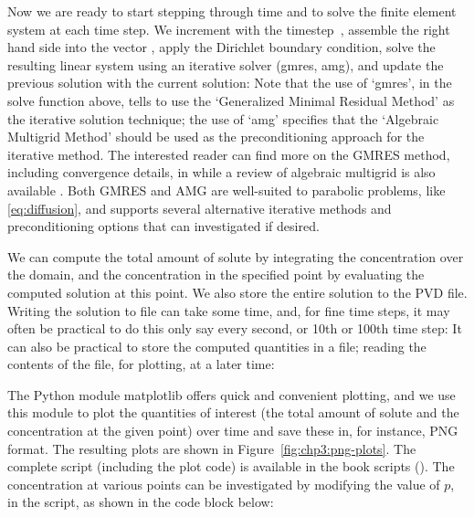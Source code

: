 Now we are ready to start stepping through time and to solve the finite
element system at each time step. We increment
 with the timestep~, assemble
the right hand side into the vector , apply the
Dirichlet boundary condition, solve the resulting linear system using
an iterative solver (gmres, amg), and update the previous solution
with the current solution:
Note that the use of `gmres', in the solve function above, tells {\fenics} to 
use the `Generalized Minimal Residual Method' as the iterative solution 
technique; the use of `amg' specifies that the `Algebraic Multigrid Method' 
should be used as the preconditioning approach for the iterative method.  The 
interested reader can find more on the GMRES method, including convergence 
details, in \cite{greenbaum1997} while a review of algebraic multigrid 
is also available \cite{stuben2001}.  Both GMRES and AMG are well-suited to 
parabolic problems, like \eqref{eq:diffusion}, and {\fenics} supports several 
alternative iterative methods and preconditioning options 
\cite{langtangen2016solving} that can investigated if desired.  %


We can compute the total amount of solute by integrating the concentration
over the domain, and the concentration in the specified point by
evaluating the computed solution at this point. We also store the
entire solution to the PVD file. Writing the solution to file can take
some time, and, for fine time steps, it may often be practical to 
do this only say every second, or 10th or 100th time step:
It can also be practical to store the computed quantities in a file; reading 
the contents of the file, for plotting, at a later time:

The Python module matplotlib offers quick and convenient plotting, and
we use this module to plot the quantities of interest (the total
amount of solute and the concentration at the given point) over time
and save these in, for instance, PNG format. The resulting plots are
shown in Figure~\ref{fig:chp3:png-plots}. The complete script
(including the plot code) is available in the book scripts
().  The concentration at various points can be 
investigated by modifying the value of $p$, in the script, as shown in the code 
block below:

